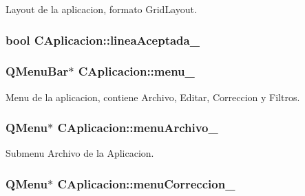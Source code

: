 Layout de la aplicacion, formato Grid\+Layout. 

\subsubsection[{\texorpdfstring{linea\+Aceptada\+\_\+}{lineaAceptada_}}]{\setlength{\rightskip}{0pt plus 5cm}bool C\+Aplicacion\+::linea\+Aceptada\+\_\+\hspace{0.3cm}{\ttfamily [private]}}\hypertarget{classCAplicacion_aa15f0bf9a36791195739ec2a6d15108d}{}\label{classCAplicacion_aa15f0bf9a36791195739ec2a6d15108d}
\subsubsection[{\texorpdfstring{menu\+\_\+}{menu_}}]{\setlength{\rightskip}{0pt plus 5cm}Q\+Menu\+Bar$\ast$ C\+Aplicacion\+::menu\+\_\+\hspace{0.3cm}{\ttfamily [private]}}\hypertarget{classCAplicacion_af1ac43fa5f82c2512f211fc0dbb00a3a}{}\label{classCAplicacion_af1ac43fa5f82c2512f211fc0dbb00a3a}


Menu de la aplicacion, contiene Archivo, Editar, Correccion y Filtros. 

\subsubsection[{\texorpdfstring{menu\+Archivo\+\_\+}{menuArchivo_}}]{\setlength{\rightskip}{0pt plus 5cm}Q\+Menu$\ast$ C\+Aplicacion\+::menu\+Archivo\+\_\+\hspace{0.3cm}{\ttfamily [private]}}\hypertarget{classCAplicacion_abdf7a15d27725756e59d4408267d4688}{}\label{classCAplicacion_abdf7a15d27725756e59d4408267d4688}


Submenu Archivo de la Aplicacion. 

\subsubsection[{\texorpdfstring{menu\+Correccion\+\_\+}{menuCorreccion_}}]{\setlength{\rightskip}{0pt plus 5cm}Q\+Menu$\ast$ C\+Aplicacion\+::menu\+Correccion\+\_\+\hspace{0.3cm}{\ttfamily [private]}}\hypertarget{classCAplicacion_acb53cba72e72d1b6feb8203a4942b436}{}\label{classCAplicacion_acb53cba72e72d1b6feb8203a4942b436}


